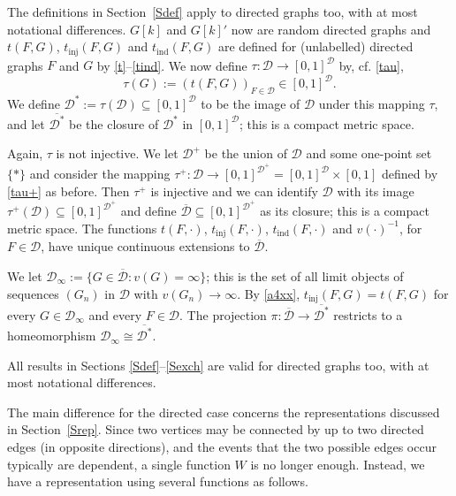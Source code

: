 \documentclass[11pt,reqno,tbtags]{amsart}
\numberwithin{equation}{section}
\theoremstyle{definition}
\theoremstyle{remark}
\newcommand{\refS}[1]{Section~\ref{#1}}
\newcommand\set[1]{\ensuremath{\{#1\}}}
\newcommand\cf{cf.\spacefactor=1000}
\newcounter{cc}
\newcommand\cD{\mathcal D}
\newcommand\qw{^{-1}}
\renewcommand{\=}{:=}
\newcommand\oi{[0,1]}
\newcommand{\tinj}{t_{\mathrm{inj}}}
\newcommand{\tind}{t_{\mathrm{ind}}}
\newcommand{\tauu}{\tau^+}
\newcommand{\DU}{\cD}
\newcommand{\DUx}[1]{\cD_{#1}}
\newcommand{\cdx}{\cD^*}
\newcommand{\cdxq}{\overline{\cdx}}
\newcommand{\cdq}{\overline{\cD}}
\newcommand{\cdd}{\cD^+}
\newcommand{\cdoo}{\DUx{\infty}}
\newcommand{\oid}{\oi^{\cD}}
\newcommand{\oidd}{\oi^{\cdd}}
\begin{document}
The definitions in \refS{Sdef} apply to directed graphs too, with at
most notational differences.
$G[k]$ and $G[k]'$ now are random directed graphs and $t(F,G)$,
$\tinj(F,G)$ and $\tind(F,G)$ are defined 
for (unlabelled) directed graphs $F$ and $G$ 
by \eqref{t}--\eqref{tind}.
We now define $\tau:\DU\to\oid$ by, \cf{} \eqref{tau}, 
\begin{equation}\label{taud}
  \tau(G)\=(t(F,G))_{F\in\cD}\in\oid. 
\end{equation}
We define $\cdx\=\tau(\cD)\subseteq\oid$ to be the image of $\cD$
under this mapping $\tau$, and let $\cdxq$ be the closure of $\cdx$ in
$\oid$; this is
a compact metric space.

Again, $\tau$ is not injective.
We let
$\cdd$ be the union of $\cD$ and some one-point set \set{*} and
consider the mapping $\tauu:\cD\to\oidd=\oid\times\oi$ defined by
\eqref{tau+} as before.
Then $\tauu$ is injective
and we can identify $\cD$ with its image $\tauu(\cD)\subseteq\oidd$
and define $\cdq\subseteq\oidd$ as its closure; this is a compact
metric space.
The functions $t(F,\cdot)$,
$\tinj(F,\cdot)$, $\tind(F,\cdot)$ and 
$v(\cdot)\qw$, for $F\in\cD$,
have unique continuous
extensions to $\cdq$.

We let $\cdoo\=\set{G\in\cdq:v(G)=\infty}$; 
this is the set of all limit objects of sequences
$(G_n)$ in $\cD$ with $v(G_n)\to\infty$.
By \eqref{a4xx}, $\tinj(F,G)=t(F,G)$ for every $G\in\cdoo$
and every $F\in\cD$. The projection $\pi:\cdq\to\cdxq$ restricts to a
homeomorphism $\cdoo\cong\cdxq$.

All results in Sections \ref{Sdef}--\ref{Sexch} are valid for directed
graphs too, with at most notational differences. 


The main difference for the directed case concerns the representations
discussed in \refS{Srep}. Since two vertices may be connected by up to
two directed edges (in opposite directions), and the events that the
two possible edges occur typically are dependent, a single function
$W$ is no longer enough. Instead, we have a representation using 
several functions as follows.
\end{document}
